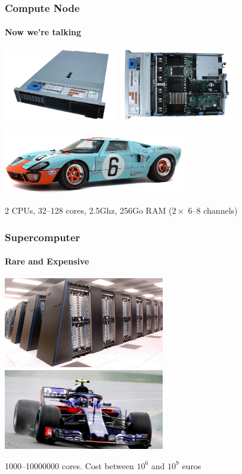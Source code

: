 \documentclass[xcolor={x11names,svgnames,psnames}]{beamer}
\begin{document}
\begin{frame}
  \frametitle{Compute Node}
  \framesubtitle{Now we're talking}
  
  \centering
  \includegraphics[width=5cm]{dell1}
  \includegraphics[width=5cm]{dell2}


  \includegraphics[width=8cm]{gt40}

  \bigskip

  2 CPUs, 32--128 cores, 2.5Ghz, 256Go RAM ($2\times$ 6--8 channels)
\end{frame}


\begin{frame}
  \frametitle{Supercomputer}
  \framesubtitle{Rare and Expensive}
  
  \centering
  \includegraphics[width=7cm]{bgp}
  \hfill
  \includegraphics[width=7cm]{f1}

  \bigskip
  
  1000--10000000 cores. Cost between $10^{6}$ and $10^{9}$ euros
\end{frame}
\end{document}
